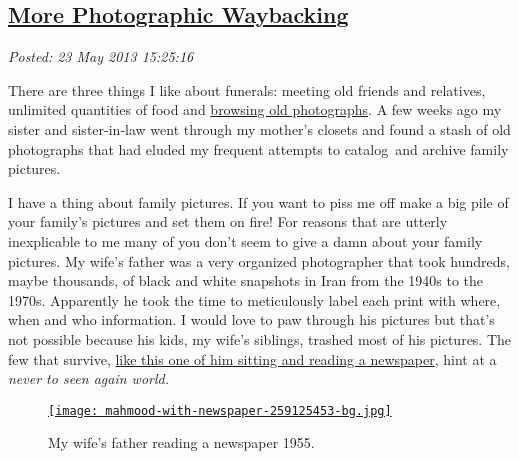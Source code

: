 %

\subsection*{\href{http://bakerjd99.wordpress.com/2013/05/23/more-photographic-waybacking/}{More Photographic Waybacking}}


\noindent\emph{Posted: 23 May 2013 15:25:16}
\vspace{6pt}

\captionsetup[figure]{labelformat=empty}

There are three things I like about funerals: meeting old friends and
relatives, unlimited quantities of food and
\href{http://bakerjd99.wordpress.com/2012/03/17/the-joys-of-photographic-waybacking/}{browsing
old photographs}. A few weeks ago my sister and sister-in-law went
through my mother's closets and found a stash of old photographs that
had eluded my frequent attempts to catalog~and archive family pictures.

I have a thing about family pictures. If you want to piss me off make a
big pile of your family's pictures and set them on fire! For reasons
that are utterly inexplicable to me many of you don't seem to give a
damn about your family pictures. My wife's father was a very organized
photographer that took hundreds, maybe thousands, of black and white
snapshots in Iran from the 1940s to the 1970s. Apparently he took the
time to meticulously label each print with where, when and who
information. I would love to paw through his pictures but that's not
possible because his kids, my wife's siblings, trashed most of his
pictures. The few that survive, \hyperlink{ht:4048X0}{like this one of him sitting and reading
a newspaper}, hint at a \emph{never to seen again world.}


\begin{figure}[htbp]
\centering
\hypertarget{ht:4048X0}{}
\href{http://conceptcontrol.smugmug.com/People/My-Wifes-Family/7081266\_Gq5ZQB\#!i=473480027\&k=f2jN5SP\&lb=1\&s=A}{\texttt{[image: mahmood-with-newspaper-259125453-bg.jpg]}}
\caption{My wife's father reading a newspaper 1955.}
\label{fig:4048X0}
\end{figure}

